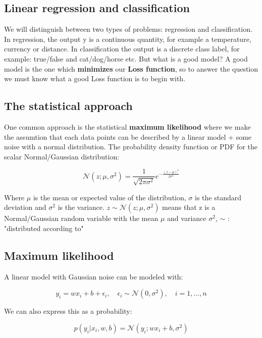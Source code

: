 \subsection*{Linear regression and classification}
We will distinguish between two types of problems: regression and classification. In regression, the output y is a continuous quantity, for example a temperature, currency or distance. In classification the output is a discrete class label, for example: true/false and cat/dog/horse etc. 
But what is a good model? A good model is the one which \textbf{minimizes} our \textbf{Loss function}, so to answer the question we must know what a good Loss function is to begin with. 

\subsection*{The statistical approach}
One common approach is the statistical \textbf{maximum likelihood} where we make the assumtion that each data points can be described by a linear model + some noise with a normal distribution. The probability density function or PDF for the scalar Normal/Gaussian distribution:

	\begin{equation}
		\mathcal{N}(z; \mu, \sigma^{2}) = \frac{1} {\sqrt{2 \pi \sigma^{2}}} e^{-\frac{(z-\mu)^{2}} {2 \sigma^{2}} } 
	\end{equation}

Where $\mu$ is the mean or expected value of the distribution, $\sigma$ is the standard deviation and $\sigma^{2}$ is the variance. $ z \sim \mathcal{N}(z; \mu, \sigma^{2})$ means that z is a Normal/Gaussian random variable with the mean $\mu$ and variance $\sigma^{2}$, $\sim$ : "distributed according to"

\subsection*{Maximum likelihood}
A linear model with Gaussian noise can be modeled with:

	\begin{equation}
		y_i = wx_i + b + \epsilon_i, \quad \epsilon_i \sim \mathcal{N}(0, \sigma^{2}), \quad i = 1,\ldots,n
	\end{equation}

We can also express this as a probability:

	\begin{equation}
		p(y_i|x_i,w,b) = \mathcal{N}(y_i;wx_i+b,\sigma^{2})
	\end{equation}

